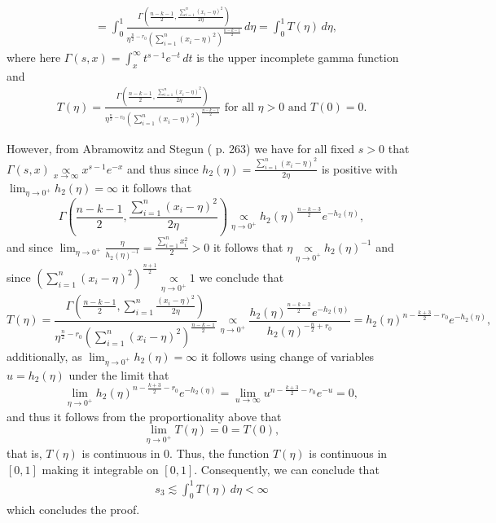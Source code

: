 \documentclass[12pt]{interact}
\theoremstyle{plain}%
\theoremstyle{definition}
\theoremstyle{remark}
\begin{document}
\begin{appendix}
\begin{equation*}
\begin{aligned}
  \\ &= \int_0^1 \frac{\Gamma\left(\frac{n-k-1}{2},\frac{\sum_{i=1}^{n}(x_i - \eta)^2}{2\eta}\right)}{\eta^{\frac{n}{2}-r_0}(\sum_{i=1}^{n}(x_i - \eta)^2)^{\frac{n-k-1}{2}}}\, d\eta =  \int_0^1 T(\eta)\, d\eta,
\end{aligned}
\end{equation*}
where here $\Gamma(s,x)=\int_x^\infty t^{s-1}e^{-t}\, dt$ is the upper incomplete gamma function and
\begin{equation*}
\begin{aligned}
T(\eta) = \frac{\Gamma\left(\frac{n-k-1}{2},\frac{\sum_{i=1}^{n}(x_i - \eta)^2}{2\eta}\right)}{\eta^{\frac{n}{2}-r_0}(\sum_{i=1}^{n}(x_i - \eta)^2)^{\frac{n-k-1}{2}}}\mbox{ for all }\eta>0\mbox{ and }T(0) = 0.
\end{aligned}
\end{equation*}

However, from Abramowitz 
and Stegun (\cite{abramowitz} p. 263) we have for all fixed $s>0$ that $\Gamma(s,x)\underset{x\to \infty}{\propto} x^{s-1}e^{-x}$ and thus since $h_2(\eta)=\frac{\sum_{i=1}^{n}(x_i - \eta)^2}{2\eta}$ is positive with 
$\lim_{\eta\to 0^+} h_2(\eta)=\infty$ it follows that
\begin{equation*} \Gamma\left(\frac{n-k-1}{2},\frac{\sum_{i=1}^{n}(x_i - \eta)^2}{2\eta}\right) \underset{\eta\to 0^+}{\propto} h_2(\eta)^{\frac{n-k-3}{2}}e^{-h_2(\eta)},
\end{equation*}
and since $\lim_{\eta\to 0^+}\frac{\eta}{h_2(\eta)^{-1}} = \frac{\sum_{i=1}^n x_i^2}{2}>0$ it follows that $\eta \underset{\eta\to 0^+}{\propto} h_2(\eta)^{-1}$ and since $(\sum_{i=1}^{n}(x_i - \eta)^2)^{\frac{n+1}{2}} \underset{\eta\to 0^+}{\propto} 1 $ we conclude that
\begin{equation*}  T(\eta) = \frac{\Gamma\left(\frac{n-k-1}{2},\sum_{i=1}^{n}\frac{(x_i - \eta)^2}{2\eta}\right)}{\eta^{\frac{n}{2}-r_0}(\sum_{i=1}^{n}(x_i - \eta)^2)^{\frac{n-k-1}{2}}}  \underset{\eta\to 0^+}{\propto} \frac{h_2(\eta)^{\frac{n-k-3}{2}}e^{-h_2(\eta)}}{h_2(\eta)^{-\frac{n}{2}+r_0}} = h_2(\eta)^{n-\frac{k+3}{2}-r_0}e^{-h_2(\eta)},
\end{equation*}
additionally, as $\lim_{\eta\to 0^+}h_2(\eta) = \infty$ it follows using change of variables $u=h_2(\eta)$ under the limit that
\begin{equation*}\lim_{\eta\to 0^+} h_2(\eta)^{n-\frac{k+3}{2}-r_0}e^{-h_2(\eta)} = \lim_{u\to \infty} u^{n-\frac{k+3}{2}-r_0}e^{-u} = 0,
\end{equation*}
and thus it follows from the proportionality above that 
\begin{equation*}
\lim_{\eta\to 0^+} T(\eta) = 0 = T(0),
\end{equation*}
that is, $T(\eta)$ is continuous in $0$. Thus, the function $T(\eta)$ is continuous in $[0,1]$ making it integrable on $[0,1]$. Consequently, we can conclude that
\begin{equation*}
\begin{aligned}
s_3 \lesssim \int_0^1 
  T(\eta)\, d\eta < \infty
\end{aligned}
\end{equation*}
which concludes the proof.


\end{appendix}
\end{document}
